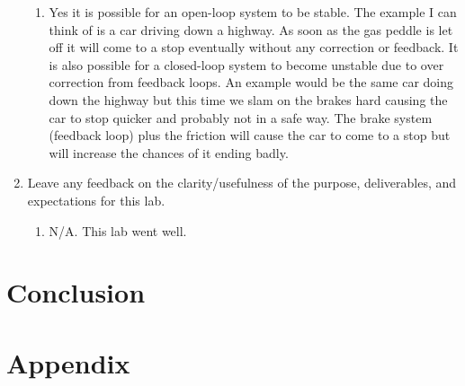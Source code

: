 \documentclass[12pt]{article}
\begin{document}
\begin{enumerate}
    \begin{enumerate}
        \item Yes it is possible for an open-loop system to be stable. The example I can think of is a car driving down a highway. As soon as the gas peddle is let off it will come to a stop eventually without any correction or feedback. It is also possible for a closed-loop system to become unstable due to over correction from feedback loops. An example would be the same car doing down the highway but this time we slam on the brakes hard causing the car to stop quicker and probably not in a safe way. The brake system (feedback loop) plus the friction will cause the car to come to a stop but will increase the chances of it ending badly.
    \end{enumerate}
    
    \item Leave any feedback on the clarity/usefulness of the purpose, deliverables, and expectations
for this lab.

    \begin{enumerate}
        \item N/A. This lab went well.
    \end{enumerate}

 \end{enumerate}

\section{Conclusion}


\section{Appendix}
\end{document}
